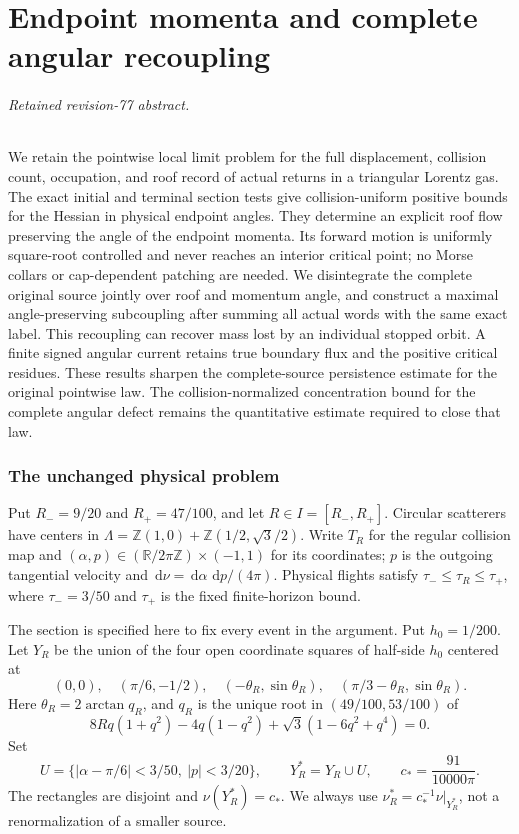 \documentclass[11pt,reqno]{amsart}
\numberwithin{equation}{section}
\theoremstyle{definition}\newtheorem{definition}[theorem]{Definition}
\theoremstyle{remark}\newtheorem{remark}[theorem]{Remark}
\newcommand{\R}{\mathbb R}\newcommand{\Z}{\mathbb Z}\newcommand{\T}{\mathbb T}
\newcommand{\dd}{\,\mathrm d}\newcommand{\one}{\mathbf1}
\theoremstyle{definition}\newtheorem{inputstatement}[theorem]{Input statement}
\begin{document}
\endgroup
\part{Endpoint momenta and complete angular recoupling}
\begingroup
\let\ArchiveLabel\label
\let\ArchiveRef\ref
\renewcommand{\label}[1]{\ArchiveLabel{v77archive:#1}}
\renewcommand{\ref}[1]{\ArchiveRef{v77archive:#1}}
\makeatletter
\let\ltx@label\label
\makeatother
\paragraph{Retained revision-77 abstract.}

We retain the pointwise local limit problem for the full displacement,
collision count, occupation, and roof record of actual returns in a
triangular Lorentz gas. The exact initial and terminal section tests
give collision-uniform positive bounds for the Hessian in physical
endpoint angles. They determine an explicit roof flow preserving the
angle of the endpoint momenta. Its forward motion is uniformly
square-root controlled and never reaches an interior critical point;
no Morse collars or cap-dependent patching are needed. We disintegrate
the complete original source jointly over roof and momentum angle,
and construct a maximal angle-preserving subcoupling after summing
all actual words with the same exact label. This recoupling can recover
mass lost by an individual stopped orbit. A finite signed angular
current retains true boundary flux and the positive critical residues.
These results sharpen the complete-source persistence estimate for
the original pointwise law. The collision-normalized concentration
bound for the complete angular defect remains the quantitative
estimate required to close that law.



\section{The unchanged physical problem}
Put $R_-=9/20$ and $R_+=47/100$, and let $R\in I=[R_-,R_+]$. Circular scatterers have centers in
$\Lambda=\Z(1,0)+\Z(1/2,\sqrt3/2)$. Write $T_R$ for the regular
collision map and $(\alpha,p)\in(\R/2\pi\Z)\times(-1,1)$ for its
coordinates; $p$ is the outgoing tangential velocity and
$\dd\nu=\dd\alpha\,\dd p/(4\pi)$. Physical flights satisfy
$\tau_-\le\tau_R\le\tau_+$, where $\tau_-=3/50$ and $\tau_+$
is the fixed finite-horizon bound.

The section is specified here to fix every event in the argument.
Put $h_0=1/200$. Let $Y_R$ be the union of the four open coordinate
squares of half-side $h_0$ centered at
\[
 (0,0),\quad(\pi/6,-1/2),\quad
 (-\theta_R,\sin\theta_R),\quad
 (\pi/3-\theta_R,\sin\theta_R).
\]
Here $\theta_R=2\arctan q_R$, and $q_R$ is the unique root in
$(49/100,53/100)$ of
\[
 8Rq(1+q^2)-4q(1-q^2)+\sqrt3(1-6q^2+q^4)=0.
\]
Set
\[
 U=\{|\alpha-\pi/6|<3/50,\ |p|<3/20\},\qquad
 Y_R^*=Y_R\cup U,\qquad c_*=\frac{91}{10000\pi}.
\]
The rectangles are disjoint and $\nu(Y_R^*)=c_*$. We always use
$\nu_R^*=c_*^{-1}\nu|_{Y_R^*}$, not a renormalization of a smaller
source.
\end{document}

